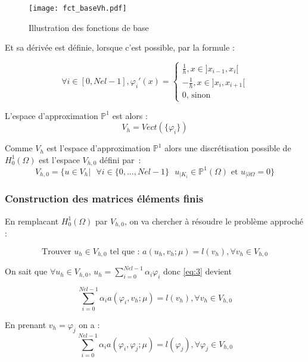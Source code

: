 \documentclass[12pt]{article}
\begin{document}
\begin{figure}[H]
\begin{center}
\texttt{[image: fct\_baseVh.pdf]}
\caption[]{Illustration des fonctions de base}
\end{center}
\end{figure}


\noindent Et sa dérivée est définie, lorsque c'est possible, par la formule :

$$
\forall i \in [0,Nel-1], 
\varphi_{i}'(x) = 
\begin{cases}
\frac{1}{h}, x \in]x_{i-1}, x_{i}[\\
-\frac{1}{h}, x \in]x_{i}, x_{i+1}[\\
0 \text{, sinon} 
\end{cases}
$$


\noindent L'espace d'approximation $\mathbb{P}^1$ est alors : $$ V_{h} = Vect (\{\varphi_{i}\})$$

\noindent Comme $ V_{h}$ est l’espace d’approximation $\mathbb{P}^1$ alors une discrétisation possible de $H^{1}_{0}(\Omega)$ est l’espace $V_{h,0}$ défini par : 
$$ 
V_{h,0} = \{u \in V_{h} | \text{ } \forall i \in \{0,..., Nel-1 \} \text{ } u_{|K_{i}} \in \mathbb{P}^1(\Omega) \text{ et } u_{| \partial \Omega} = 0 \} 
$$



\subsubsection {Construction des matrices éléments finis}

\noindent En remplacant $H_{0}^{1}(\Omega)$ par $V_{h,0}$, on va chercher à résoudre le problème approché : 

\begin{equation} \label{eq:3}
\text{Trouver } u_h \in V_{h,0} \text{ tel que : } a(u_h, v_h;\mu) = l(v_h), \forall v_h \in V_{h,0}
\end{equation}

\noindent On sait que $\forall u_h \in V_{h,0}$, $u_h = \sum_{i = 0}^{Nel-1} \alpha_i\varphi_{i}$ donc \eqref{eq:3} devient

\begin{equation*} 
 \sum_{i = 0}^{Nel-1}\alpha_ia(\varphi_{i}, v_h;\mu) = l(v_h), \forall v_h \in V_{h,0}
\end{equation*}

\noindent En prenant $v_h = \varphi_{j}$ on a :
\begin{equation*} 
 \sum_{i = 0}^{Nel-1}\alpha_i a(\varphi_{i}, \varphi_{j};\mu) = l(\varphi_{j}), \forall \varphi_{j} \in V_{h,0}
\end{equation*}
\end{document}
